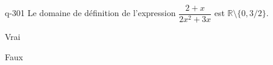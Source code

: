 \begin{truefalse}{q-301}
Le domaine de définition de l'expression $\dfrac{2+x}{2x^2+3x}$ est $\mathbb R \setminus \{0,3/2\}$.
\item Vrai
\item* Faux
\end{truefalse}

